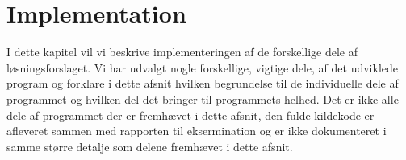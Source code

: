 \chapter{Implementation}\label{Implementation}
I dette kapitel vil vi beskrive implementeringen af de forskellige dele af løsningsforslaget. Vi har udvalgt nogle forskellige, vigtige dele, af det udviklede program og forklare i dette afsnit hvilken begrundelse til de individuelle dele af programmet og hvilken del det bringer til programmets helhed. Det er ikke alle dele af programmet der er fremhævet i dette afsnit, den fulde kildekode er afleveret sammen med rapporten til eksermination og er ikke dokumenteret i samme større detalje som delene fremhævet i dette afsnit.









